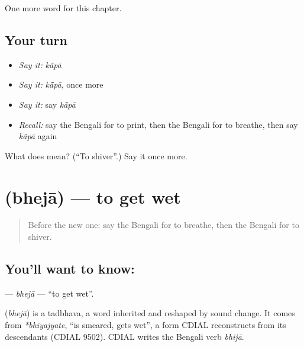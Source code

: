 \begin{grammarlens}[title={What you've built}]
One more word for this chapter.
\end{grammarlens}

\subsection*{Your turn}
\begin{itemize}
\raggedright
  \item \emph{Say it:} \emph{kā̃pā}
  \item \emph{Say it:} \emph{kā̃pā}, once more
  \item \emph{Say it:} say \emph{kā̃pā}
  \item \emph{Recall:} say the Bengali for to print, then the Bengali for to breathe, then say \emph{kā̃pā} again
\end{itemize}

\begin{tcolorbox}[breakable,colback=teal!4,colframe=teal!35!black,title={Before you move on}]
What does  mean? (\textquotedblleft{}To shiver\textquotedblright{}.) Say it once more.
\end{tcolorbox}
\section[\texorpdfstring{\bn{ভেজা} (bhejā)}{ভেজা (bhejā)}]{ (bhejā) — to get wet}

\label{lesson:BN-C181-bheja}



\begin{quote}
Before the new one: say the Bengali for to breathe, then the Bengali for to shiver.
\end{quote}

\subsection*{You'll want to know: }
\textbf{} — \emph{bhejā} — \textquotedblleft{}to get wet\textquotedblright{}.

\begin{cousinweb}
\textbf{} (\emph{bhejā}) is a tadbhava, a word inherited and reshaped by sound change. It comes from \emph{*bhiyajyate}, \textquotedblleft{}is smeared, gets wet\textquotedblright{}, a form CDIAL reconstructs from its descendants (CDIAL 9502). CDIAL writes the Bengali verb \emph{bhijā}.
\end{cousinweb}


